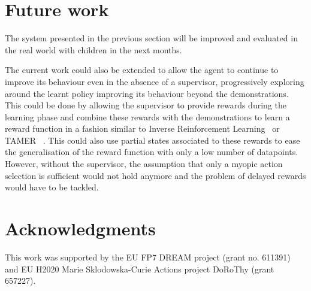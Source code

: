 \documentclass[letterpaper]{article} %
\begin{document}
\section{Future work}

The system presented in the previous section will be improved and
evaluated in the real world with children in the next months.

The current work could also be extended to allow the agent to continue to
improve its behaviour even in the absence of a supervisor, progressively
exploring around the learnt policy improving its behaviour beyond the
demonstrations. This could be done by allowing the supervisor to provide rewards
during the learning phase and combine these rewards with the demonstrations to
learn a reward function in a fashion similar to Inverse Reinforcement
Learning~\cite{abbeel2004apprenticeship} or TAMER ~\cite{knox2009interactively}.
This could also use partial states associated to these rewards to ease the
generalisation of the reward function with only a low number of datapoints. However,
without the supervisor, the assumption that only a myopic action selection is
sufficient would not hold anymore and the problem of delayed rewards would have
to be tackled.

\section{Acknowledgments} This work was supported by the EU FP7 DREAM project
(grant no.  611391) and EU H2020 Marie Sklodowska-Curie Actions project DoRoThy
(grant 657227).  

 
\end{document}
